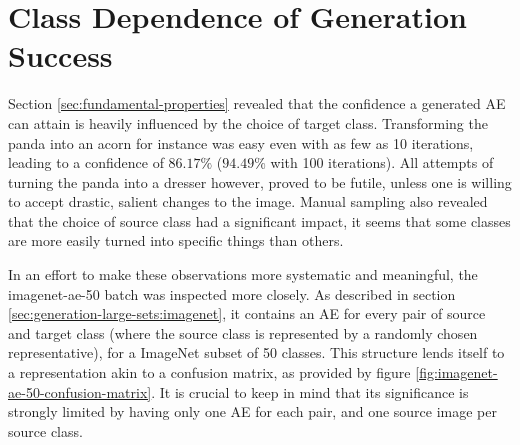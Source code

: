 \documentclass[11pt, a4paper]{article}
\begin{document}









\section{Class Dependence of Generation Success}
\label{sec:class-dependence-generation-success}
Section \ref{sec:fundamental-properties} revealed that the confidence a generated AE can attain is heavily influenced by the choice of target class. Transforming the panda into an acorn for instance was easy even with as few as 10 iterations, leading to a confidence of $86.17\%$ ($94.49\%$ with 100 iterations). All attempts of turning the panda into a dresser however, proved to be futile, unless one is willing to accept drastic, salient changes to the image. Manual sampling also revealed that the choice of source class had a significant impact, it seems that some classes are more easily turned into specific things than others.

In an effort to make these observations more systematic and meaningful, the imagenet-ae-50 batch was inspected more closely. As described in section \ref{sec:generation-large-sets:imagenet}, it contains an AE for every pair of source and target class (where the source class is represented by a randomly chosen representative), for a ImageNet subset of 50 classes. This structure lends itself to a representation akin to a confusion matrix, as provided by figure \ref{fig:imagenet-ae-50-confusion-matrix}. It is crucial to keep in mind that its significance is strongly limited by having only one AE for each pair, and one source image per source class.
\end{document}
